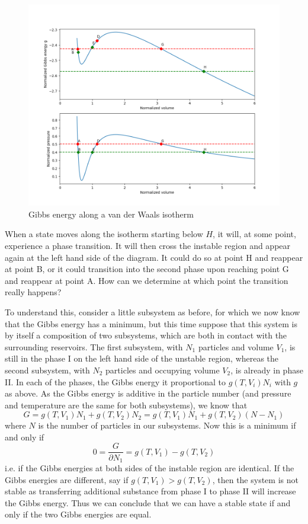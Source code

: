 \documentclass[a4paper, draft]{report}
\numberwithin{section}{chapter}
\numberwithin{equation}{chapter}
\theoremstyle{own}
\theoremstyle{remark}
\begin{document}
\begin{figure}[ht]
\centering
\includegraphics[scale=0.5]{VanDerWaalsMaxwell}
\caption{Gibbs energy along a van der Waals isotherm}
\label{fig:VanDerWaalsMaxwell}
\end{figure}

When a state moves along the isotherm starting below $H$, it will, at some point, experience a phase transition. It will then cross the instable region and appear again at the left hand side of the diagram. It could do so at point H and reappear at point 
B, or it could transition into the second phase upon reaching point G and reappear at point A. How can we determine at which point the transition really happens?

To understand this, consider a little subsystem as before, for which we now know that the Gibbs energy has a minimum, but this time suppose that this system is by itself a composition of two subsystems, which are both in contact with the surrounding reservoirs. The first subsystem, with $N_1$ particles and volume $V_1$, is still in the phase I on the left hand side of the unstable region, whereas the second subsystem, with $N_2$ particles and occupying volume $V_2$, is already in phase II. In each of the phases, the Gibbs energy it proportional to $g(T, V_i) N_i$ with $g$ as above. As the Gibbs energy is additive in the particle number (and pressure and temperature are the same for both subsystems), we know that
$$
G = g(T, V_1) N_1 + g(T, V_2) N_2 = g(T, V_1) N_1 + g(T, V_2) (N - N_1)
$$
where $N$ is the number of particles in our subsystems. Now this is a minimum if and only if
$$
0 = \frac{G}{\partial N_1} = g(T, V_1) - g(T, V_2)
$$
i.e. if the Gibbs energies at both sides of the instable region are identical. If the Gibbs energies are different, say if $g(T, V_1) > g(T, V_2)$, then the system is not stable as transferring additional substance from phase I to phase II will increase the Gibbs energy. Thus we can conclude that we can have a stable state if and only if the two Gibbs energies are equal.
\end{document}
